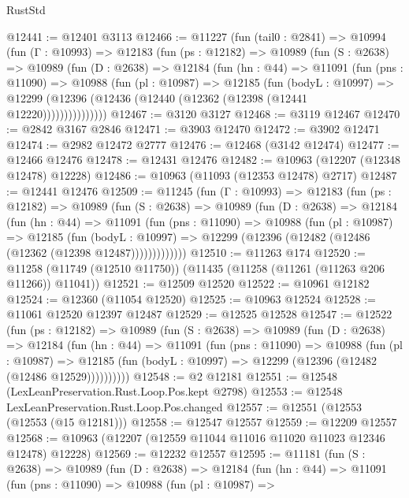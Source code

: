 \begin{lexlean}{RustStd}
\begin{coremodule}
@12441 := @12401 @3113
@12466 := @11227
    (fun (tail0 : @2841) =>
    @10994
      (fun (Γ : @10993) =>
      @12183
        (fun (ps : @12182) =>
        @10989
          (fun (S : @2638) =>
          @10989
            (fun (D : @2638) =>
            @12184
              (fun (hn : @44) =>
              @11091
                (fun (pns : @11090) =>
                @10988
                  (fun (pl : @10987) =>
                  @12185
                    (fun (bodyL : @10997) =>
                    @12299 (@12396 (@12436 (@12440 (@12362 (@12398 (@12441 @12220)))))))))))))))
@12467 := @3120 @3127
@12468 := @3119 @12467
@12470 := @2842 @3167 @2846
@12471 := @3903 @12470
@12472 := @3902 @12471
@12474 := @2982 @12472 @2777
@12476 := @12468 (@3142 @12474)
@12477 := @12466 @12476
@12478 := @12431 @12476
@12482 := @10963 (@12207 (@12348 @12478) @12228)
@12486 := @10963 (@11093 (@12353 @12478) @2717)
@12487 := @12441 @12476
@12509 := @11245
    (fun (Γ : @10993) =>
    @12183
      (fun (ps : @12182) =>
      @10989
        (fun (S : @2638) =>
        @10989
          (fun (D : @2638) =>
          @12184
            (fun (hn : @44) =>
            @11091
              (fun (pns : @11090) =>
              @10988
                (fun (pl : @10987) =>
                @12185
                  (fun (bodyL : @10997) =>
                  @12299 (@12396 (@12482 (@12486 (@12362 (@12398 @12487)))))))))))))
@12510 := @11263 @174
@12520 := @11258 (@11749 (@12510 @11750)) (@11435 (@11258 (@11261 (@11263 @206 @11266)) @11041))
@12521 := @12509 @12520
@12522 := @10961 @12182
@12524 := @12360 (@11054 @12520)
@12525 := @10963 @12524
@12528 := @11061 @12520 @12397 @12487
@12529 := @12525 @12528
@12547 := @12522
    (fun (ps : @12182) =>
    @10989
      (fun (S : @2638) =>
      @10989
        (fun (D : @2638) =>
        @12184
          (fun (hn : @44) =>
          @11091
            (fun (pns : @11090) =>
            @10988
              (fun (pl : @10987) =>
              @12185 (fun (bodyL : @10997) => @12299 (@12396 (@12482 (@12486 @12529))))))))))
@12548 := @2 @12181
@12551 := @12548 (LexLeanPreservation.Rust.Loop.Pos.kept @2798)
@12553 := @12548 LexLeanPreservation.Rust.Loop.Pos.changed
@12557 := @12551 (@12553 (@12553 (@15 @12181)))
@12558 := @12547 @12557
@12559 := @12209 @12557
@12568 := @10963 (@12207 (@12559 @11044 @11016 @11020 @11023 @12346 @12478) @12228)
@12569 := @12232 @12557
@12595 := @11181
    (fun (S : @2638) =>
    @10989
      (fun (D : @2638) =>
      @12184
        (fun (hn : @44) =>
        @11091
          (fun (pns : @11090) =>
          @10988
            (fun (pl : @10987) =>

\end{coremodule}
\end{lexlean}
